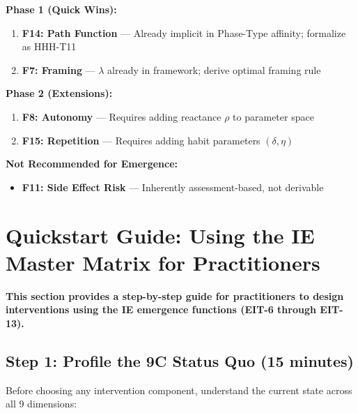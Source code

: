 \begin{tcolorbox}[colback=blue!5!white, colframe=blue!75!black,
    title=\textbf{Recommended Prioritization}]

\textbf{Phase 1 (Quick Wins):}
\begin{enumerate}[nosep]
    \item \textbf{F14: Path Function} --- Already implicit in Phase-Type affinity; formalize as HHH-T11
    \item \textbf{F7: Framing} --- $\lambda$ already in framework; derive optimal framing rule
\end{enumerate}

\textbf{Phase 2 (Extensions):}
\begin{enumerate}[nosep]
    \item \textbf{F8: Autonomy} --- Requires adding reactance $\rho$ to parameter space
    \item \textbf{F15: Repetition} --- Requires adding habit parameters $(\delta, \eta)$
\end{enumerate}

\textbf{Not Recommended for Emergence:}
\begin{itemize}[nosep]
    \item \textbf{F11: Side Effect Risk} --- Inherently assessment-based, not derivable
\end{itemize}

\end{tcolorbox}


\section{Quickstart Guide: Using the IE Master Matrix for Practitioners}
\label{sec:hhh-quickstart}

\textbf{This section provides a step-by-step guide for practitioners to design interventions using the IE emergence functions (EIT-6 through EIT-13).}

\subsection{Step 1: Profile the 9C Status Quo (15 minutes)}

Before choosing any intervention component, understand the current state across all 9 dimensions:

